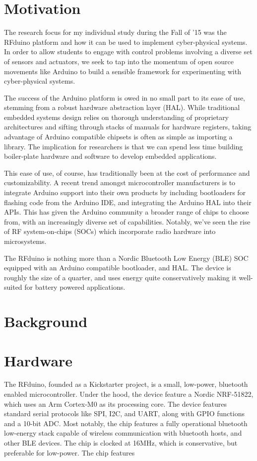 \documentclass[Nomencl]{SelimArticle}
\begin{document}
\mytitlepage
\tableofcontents
\newpage
\printnomenclature %
\newpage

\section{Motivation}
The research focus for my individual study during the Fall of '15 was the RFduino platform and how it can be used to implement cyber-physical systems. In order to allow students to engage with control problems involving a diverse set of sensors and actuators, we seek to tap into the momentum of open source movements like Arduino to build a sensible framework for experimenting with cyber-physical systems. 

The success of the Arduino platform is owed in no small part to its ease of use, stemming from a robust hardware abstraction layer (HAL). While traditional embedded systems design relies on thorough understanding of proprietary architectures and sifting through stacks of manuals for hardware registers, taking advantage of Arduino compatible chipsets is often as simple as importing a library. The implication for researchers is that we can spend less time building boiler-plate hardware and software to develop embedded applications. 

This ease of use, of course, has traditionally been at the cost of performance and customizability. A recent trend amongst microcontroller manufacturers is to integrate Arduino support into their own products by including bootloaders for flashing code from the Arduino IDE, and integrating the Arduino HAL into their APIs. This has given the Arduino community a broader range of chips to choose from, with an increasingly diverse set of capabilities. Notably, we've seen the rise of RF system-on-chips (SOCs) which incorporate radio hardware into microsystems. 

The RFduino is nothing more than a Nordic Bluetooth Low Energy (BLE) SOC equipped with an Arduino compatible bootloader, and HAL. The device is roughly the size of a quarter, and uses energy quite conservatively making it well-suited for battery powered applications. 

 

\section{Background}

\section{Hardware}
The RFduino, founded as a Kickstarter project, is a small, low-power, bluetooth enabled microcontroller. Under the hood, the device feature a Nordic NRF-51822, which uses an Arm Cortex-M0 as its processing core. The device features standard serial protocols like SPI, I2C, and UART, along with GPIO functions and a 10-bit ADC. Most notably, the chip features a fully operational bluetooth low-energy stack capable of wireless communication with bluetooth hosts, and other BLE devices. The chip is clocked at 16MHz, which is conservative, but preferable for low-power. The chip features 
\end{document}
